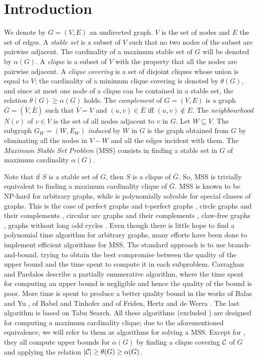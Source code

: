 

\section{Introduction}
\label{Se-Introd}

We denote by $G=(V,E)$ an undirected graph. $V$ is 
the set of nodes and $E$ the set of edges. A {\it stable set} is 
a subset of $V$ such that no two nodes of the subset are 
pairwise adjacent. The cardinality of a maximum stable set of $G$
will be denoted by $\alpha(G)$. 
 A {\it clique} is a subset of $V$  with the property that all
the nodes are pairwise adjacent. A {\it clique covering} is a set
of  disjoint cliques whose union is equal to $V$; the cardinality 
of a minimum clique covering is denoted by $\theta(G)$, and  since
at most one node of a clique can be contained in a stable set, the
relation $\theta(G) \geq \alpha (G)$ holds. 
 The {\it complement} 
of $G=(V,E)$ is a graph $\bar G = (\bar V,\bar E)$ such that $\bar V
= V$ and $(u,v)  \in \bar E$  iff $(u,v) \notin E$. 
 The {\it neighbourhood} $N(v)$ of $v \in V$ is the set of all
nodes adjacent to $v$ in $G$. Let $W \subseteq V$. The subgraph
$G_W=(W,E_W)$ {\it induced} by $W$ in $G$ is the graph obtained
from $G$ by eliminating all the nodes in $V-W$ and all the edges
incident with them. 
The {\it Maximum Stable Set  Problem} (MSS)
consists in finding a stable set in $G$ of maximum cardinality
$\alpha(G)$. 

Note that if $S$ is a  stable set
of $G$, then $S$ is a clique of $\bar G$. So, MSS is  trivially
equivalent to finding a maximum cardinality clique of  $\bar G$.  
MSS is known to be NP-hard \cite{GaJo77} for
 arbitrary graphs, while is polynomially solvable for special 
classes of graphs. This is the case of perfect graphs and t-perfect 
graphs \cite{GrLoSc88}, circle graphs and their complements
\cite{Ga73}, circular arc graphs and their  complements
\cite{Ga74,GuLeLe82}, claw-free graphs \cite{Mi80}, graphs without
long odd cycles \cite{HsIkNe81}.  Even though there  is little hope
to find a polynomial time algorithm for arbitrary  graphs, many
efforts have been done to implement efficient  algorithms for MSS.
The standard  approach is to use branch-and-bound, trying to obtain 
the best compromise between the quality of the upper bound and the
time spent to compute it in each subproblem. Carraghan and  Pardalos
\cite{CaPa90} describe a partially enumerative algorithm,  where the
time spent for computing an upper  bound is negligible and hence the
quality of the bound is poor.  More time is spent to produce a
better quality bound in the works  of Balas and Yu \cite{BaYu86}, of
Babel and Tinhofer \cite{Ba90} \cite{BaTi90} and  of Friden, Hertz
and de Werra \cite{FrHeWe90}. The last algorithm is based on Tabu
Search. All these algorithms (excluded \cite{FrHeWe90}) are designed
for computing a maximum cardinality clique; due to the aforementioned
equivalence, we will refer to them as algorithms for solving a MSS.
Except for \cite{CaPa90}, they all compute upper bounds for 
$\alpha(G)$ by finding a clique covering $\cal C$ of  $G$ and
applying the relation $|{\cal C}| \geq \theta(G) \geq \alpha(G)$. 

